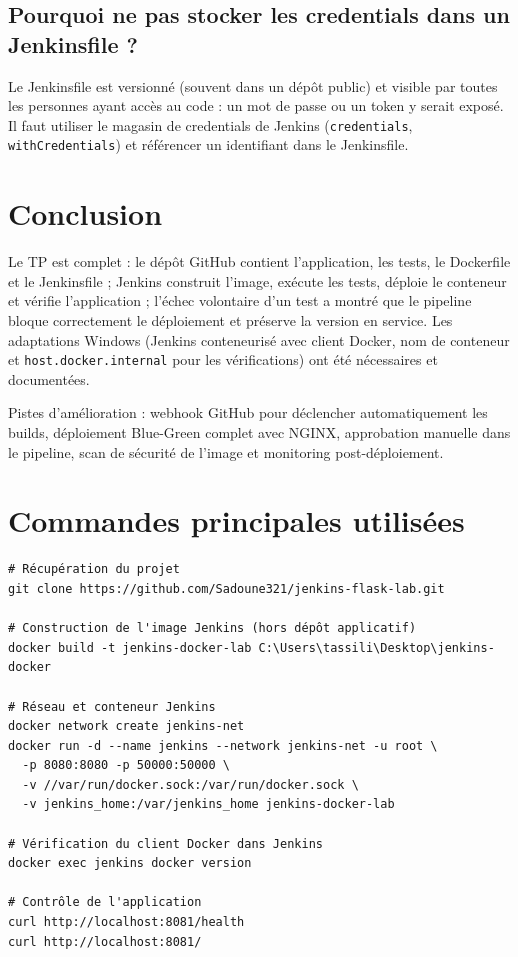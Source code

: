 \documentclass[11pt,a4paper]{article}
\begin{document}
\subsection{Pourquoi ne pas stocker les credentials dans un Jenkinsfile ?}
Le Jenkinsfile est versionné (souvent dans un dépôt public) et visible par toutes les
personnes ayant accès au code : un mot de passe ou un token y serait exposé. Il faut
utiliser le magasin de credentials de Jenkins (\texttt{credentials},
\texttt{withCredentials}) et référencer un identifiant dans le Jenkinsfile.

\section{Conclusion}

Le TP est complet : le dépôt GitHub contient l'application, les tests, le Dockerfile et
le Jenkinsfile ; Jenkins construit l'image, exécute les tests, déploie le conteneur et
vérifie l'application ; l'échec volontaire d'un test a montré que le pipeline bloque
correctement le déploiement et préserve la version en service. Les adaptations Windows
(Jenkins conteneurisé avec client Docker, nom de conteneur et
\texttt{host.docker.internal} pour les vérifications) ont été nécessaires et documentées.

Pistes d'amélioration : webhook GitHub pour déclencher automatiquement les builds,
déploiement Blue-Green complet avec NGINX, approbation manuelle dans le pipeline,
scan de sécurité de l'image et monitoring post-déploiement.

\appendix
\section{Commandes principales utilisées}

\begin{lstlisting}
# Récupération du projet
git clone https://github.com/Sadoune321/jenkins-flask-lab.git

# Construction de l'image Jenkins (hors dépôt applicatif)
docker build -t jenkins-docker-lab C:\Users\tassili\Desktop\jenkins-docker

# Réseau et conteneur Jenkins
docker network create jenkins-net
docker run -d --name jenkins --network jenkins-net -u root \
  -p 8080:8080 -p 50000:50000 \
  -v //var/run/docker.sock:/var/run/docker.sock \
  -v jenkins_home:/var/jenkins_home jenkins-docker-lab

# Vérification du client Docker dans Jenkins
docker exec jenkins docker version

# Contrôle de l'application
curl http://localhost:8081/health
curl http://localhost:8081/
\end{lstlisting}
\end{document}
